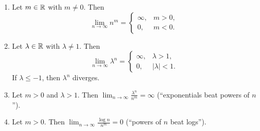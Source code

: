 \documentclass[../analysis1.tex]{subfiles}
\begin{document}
\begin{theorem}
\label{thm:growthcomparisons}
    \begin{shaded*}\phantom{a}
        \begin{enumerate}
            \item[1.] Let $m\in\mathbb{R}$ with $m\ne 0$. Then $$\lim_{n\to\infty}n^m=\begin{cases}\infty, & m>0,\\ 0,& m<0.\end{cases}$$
            \item[2.] Let $\lambda\in\mathbb{R}$ with $\lambda\ne 1$. Then $$\lim_{n\to\infty}\lambda^n=\begin{cases}
                \infty,& \lambda>1,\\
                0,& |\lambda|<1.
            \end{cases}$$ 
            If $\lambda\le -1$, then $\lambda^n$ diverges.
            \item[3.] Let $m>0$ and $\lambda>1$. Then $\lim_{n\to\infty}\frac{\lambda^n}{n^m}=\infty$ (``exponentials beat powers of $n$'').
            \item[4.] Let $m>0$. Then $\lim_{n\to\infty}\frac{\log n}{n^m}=0$ (``powers of $n$ beat logs'').
        \end{enumerate}
    \end{shaded*}
\end{theorem}
\end{document}
